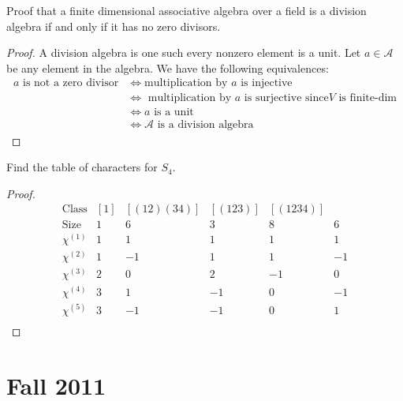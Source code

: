 \documentclass[openany]{book}
\begin{document}
\begin{prob}
    Proof that a finite dimensional associative algebra over a field is a division algebra if and only if it has no zero divisors.
\end{prob}
\begin{proof}
    A division algebra is one such every nonzero element is a unit. Let $a\in\mathcal{A}$ be any element in the algebra. We have the following equivalences:
    \begin{align*}
        a \text{ is not a zero divisor}&\iff \text{multiplication by $a$ is injective}\\
        &\iff \text{ multiplication by $a$ is surjective since} V \text{ is finite-dim}\\
        &\iff a \text{ is a unit}\\
        &\iff \mathcal{A} \text{ is a division algebra}
    \end{align*}

\end{proof}



\begin{prob}
    Find the table of characters for \(S_{4}\).
\end{prob}
\begin{proof}
    \begin{equation*}
        \begin{array}{c|ccccc}
            \text{Class} & [1] & [(12)(34)] & [(123)] & [(1234)] \\
            \text{Size} & 1 & 6 & 3 & 8 & 6 \\
            \hline
            \chi^{(1)} & 1 & 1 & 1 & 1 & 1 \\
            \chi^{(2)} & 1 & -1 & 1 & 1 & -1 \\
            \chi^{(3)} & 2 & 0 & 2 & -1 & 0 \\
            \chi^{(4)} & 3 & 1 & -1 & 0 & -1 \\
            \chi^{(5)} & 3 & -1 & -1 & 0 & 1 \\
            \end{array}
    \end{equation*}
\end{proof}







\chapter{Fall 2011}
\end{document}
